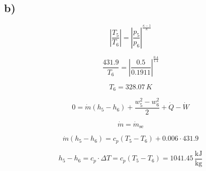 

\subsection*{b)}

\[
\left| \frac{T_5}{T_6} \right| = \left| \frac{p_5}{p_6} \right|^{\frac{\kappa - 1}{\kappa}}
\]

\[
\frac{431.9}{T_6} = \left| \frac{0.5}{0.1911} \right|^{\frac{0.4}{1.4}}
\]

\[
T_6 = 328.07 \, K
\]

\[
0 = \dot{m} (h_5 - h_6) + \frac{w_5^2 - w_6^2}{2} + \dot{Q} - \dot{W}
\]

\[
\dot{m} = \dot{m}_{\text{se}}
\]

\[
\dot{m} (h_5 - h_6) = c_p (T_5 - T_6) + 0.006 \cdot 431.9
\]

\[
h_5 - h_6 = c_p \cdot \Delta T = c_p (T_5 - T_6) = 1041.45 \, \frac{\text{kJ}}{\text{kg}}
\]